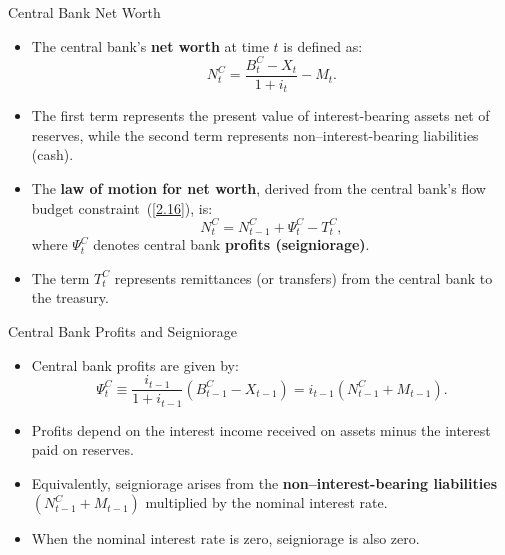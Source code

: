 \documentclass[11pt,aspectratio=169]{beamer}
\begin{document}
\begin{frame}{Central Bank Net Worth}
\small
\begin{itemize}

    \item The central bank’s \textbf{net worth} at time $t$ is defined as:
    \begin{equation*}
        N_t^C = \frac{B_t^C - X_t}{1 + i_t} - M_t.
    \end{equation*}
    \vspace{0.3em}

    \item The first term represents the present value of interest-bearing assets net of reserves, while the second term represents non–interest-bearing liabilities (cash).
    \vspace{0.5em}

    \item The \textbf{law of motion for net worth}, derived from the central bank’s flow budget constraint~(\ref{2.16}), is:
    \begin{equation*}
        N_t^C = N_{t-1}^C + \Psi_t^C - T_t^C,
    \end{equation*}
    where $\Psi_t^C$ denotes central bank \textbf{profits (seigniorage)}.
    \vspace{0.5em}

    \item The term $T_t^C$ represents remittances (or transfers) from the central bank to the treasury.
\end{itemize}

\end{frame}

\begin{frame}{Central Bank Profits and Seigniorage}

\begin{itemize}

    \item Central bank profits are given by:
    \begin{equation*}
        \Psi_t^C \equiv 
        \frac{i_{t-1}}{1+i_{t-1}}(B_{t-1}^C - X_{t-1})
        = i_{t-1}(N_{t-1}^C + M_{t-1}).
    \end{equation*}
    \vspace{0.4em}

    \item Profits depend on the interest income received on assets minus the interest paid on reserves.
    \vspace{0.6em}

    \item Equivalently, seigniorage arises from the \textbf{non–interest-bearing liabilities} 
    $(N_{t-1}^C + M_{t-1})$ multiplied by the nominal interest rate.
    \vspace{0.6em}

    \item When the nominal interest rate is zero, seigniorage is also zero.
\end{itemize}

\end{frame}
\end{document}
